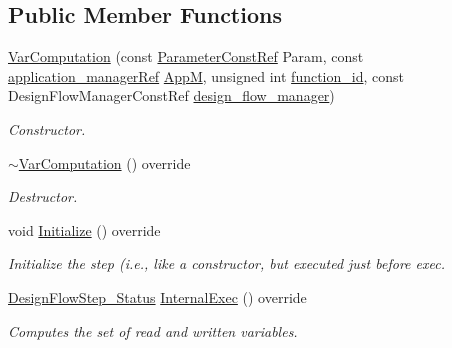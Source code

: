 \subsection*{Public Member Functions}
\begin{DoxyCompactItemize}
\item 
\hyperlink{classVarComputation_ad83a5cc15eae4a3362c40224871ed7c2}{Var\+Computation} (const \hyperlink{Parameter_8hpp_a37841774a6fcb479b597fdf8955eb4ea}{Parameter\+Const\+Ref} Param, const \hyperlink{application__manager_8hpp_a04ccad4e5ee401e8934306672082c180}{application\+\_\+manager\+Ref} \hyperlink{classFrontendFlowStep_a0ac0d8db2a378416583f51c4faa59d15}{AppM}, unsigned int \hyperlink{classFunctionFrontendFlowStep_a58ef2383ad1a212a8d3f396625a4b616}{function\+\_\+id}, const Design\+Flow\+Manager\+Const\+Ref \hyperlink{classDesignFlowStep_ab770677ddf087613add30024e16a5554}{design\+\_\+flow\+\_\+manager})
\begin{DoxyCompactList}\small\item\em Constructor. \end{DoxyCompactList}\item 
\hyperlink{classVarComputation_acd7be82192c76ea5af7116ed27063d64}{$\sim$\+Var\+Computation} () override
\begin{DoxyCompactList}\small\item\em Destructor. \end{DoxyCompactList}\item 
void \hyperlink{classVarComputation_a99f7f770ae1073b7e563159ef4fa42a5}{Initialize} () override
\begin{DoxyCompactList}\small\item\em Initialize the step (i.\+e., like a constructor, but executed just before exec. \end{DoxyCompactList}\item 
\hyperlink{design__flow__step_8hpp_afb1f0d73069c26076b8d31dbc8ebecdf}{Design\+Flow\+Step\+\_\+\+Status} \hyperlink{classVarComputation_a8c4cd153c99d3a411b69e9574f0c6447}{Internal\+Exec} () override
\begin{DoxyCompactList}\small\item\em Computes the set of read and written variables. \end{DoxyCompactList}\end{DoxyCompactItemize}
